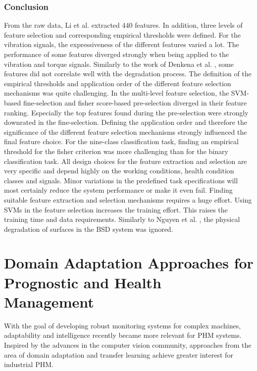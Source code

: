 \subsubsection{Conclusion}
From the raw data, Li et al. \cite{LiPin2018} extracted 440 features. In addition, three levels of feature selection and corresponding empirical thresholds were defined. For the vibration signals, the expressiveness of the different features varied a lot. The performance of some features diverged strongly when being applied to the vibration and torque signals. Similarly to the work of Denkena et al. \cite{Denkena2021}, some features did not correlate well with the degradation process. The definition of the empirical thresholds and application order of the different feature selection mechanisms was quite challenging. In the multi-level feature selection, the SVM-based fine-selection and fisher score-based pre-selection diverged in their feature ranking. Especially the top features found during the pre-selection were strongly downrated in the fine-selection. Defining the application order and therefore the significance of the different feature selection mechanisms strongly influenced the final feature choice. For the nine-class classification task, finding an empirical threshold for the fisher criterion was more challenging than for the binary classification task. All design choices for the feature extraction and selection are very specific and depend highly on the working conditions, health condition classes and signals. Minor variations in the predefined task specifications will most certainly reduce the system performance or make it even fail. Finding suitable feature extraction and selection mechanisms requires a huge effort. Using SVMs in the feature selection increases the training effort. This raises the training time and data requirements. Similarly to Nguyen et al. \cite{NGUYEN2019}, the physical degradation of surfaces in the BSD system was ignored. 


\section{Domain Adaptation Approaches for Prognostic and Health Management} \label{sec:domain_adaption_approach}
With the goal of developing robust monitoring systems for complex machines, adaptability and intelligence recently became more relevant for PHM systems. Inspired by the advances in the computer vision community, approaches from the area of domain adaptation and transfer learning achieve greater interest for industrial PHM. 

